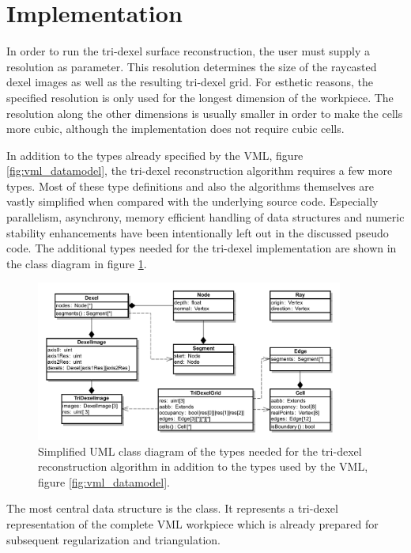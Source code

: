 \section{Implementation}
\label{sec:tri_dexel_implementation}

In order to run the tri-dexel surface reconstruction, the user must supply a resolution as parameter.
This resolution determines the size of the raycasted dexel images as well as the resulting tri-dexel grid.
For esthetic reasons, the specified resolution is only used for the longest dimension of the workpiece.
The resolution along the other dimensions is usually smaller in order to make the cells more cubic, although the implementation does not require cubic cells.


In addition to the types already specified by the VML, \cf figure \ref{fig:vml_datamodel}, the tri-dexel reconstruction algorithm requires a few more types.
Most of these type definitions and also the algorithms themselves are vastly simplified when compared with the underlying source code.
Especially parallelism, asynchrony, memory efficient handling of data structures and numeric stability enhancements have been intentionally left out in the discussed pseudo code.
The additional types needed for the tri-dexel implementation are shown in the class diagram in figure \ref{fig:tri_dexel_datamodel}.
%
\begin{figure}
	\centering
	\includegraphics[width=0.9\textwidth]{images/tri_dexel_datamodel}
	\caption{
		Simplified UML class diagram of the types needed for the tri-dexel reconstruction algorithm in addition to the types used by the VML, \cf figure \ref{fig:vml_datamodel}.
	}
	\label{fig:tri_dexel_datamodel}
\end{figure}
%
The most central data structure is the  class.
It represents a tri-dexel representation of the complete VML workpiece which is already prepared for subsequent regularization and triangulation.
